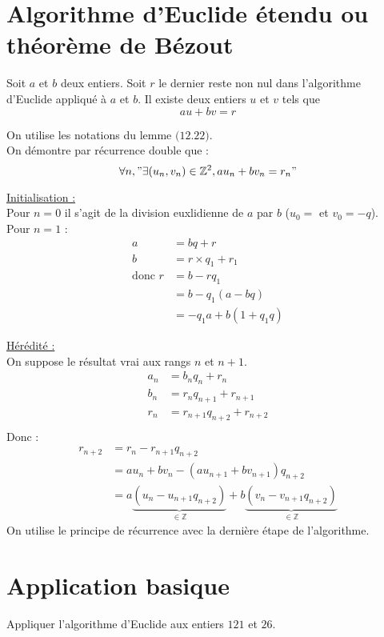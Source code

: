 \documentclass[../main.tex]{subfiles}
\begin{document}
\setcounter{section}{22}
\section{Algorithme d'Euclide étendu ou théorème de Bézout}
\begin{tcolorbox}[title=Lemme 12.23, title filled=false, colframe=orange, colback=orange!10!white]
    Soit $a$ et $b$ deux entiers. Soit $r$ le dernier reste non nul dans l'algorithme d'Euclide appliqué à $a$ et $b$. Il existe deux entiers $u$ et $v$ tels que
    $$au + bv = r$$
\end{tcolorbox}

On utilise les notations du lemme $\text{(12.22)}$. \\
On démontre par récurrence double que : 
$$\forall n, "\exists (u_n, v_n) \in \mathbb{Z}^2, au_n + bv_n = r_n"$$

\underline{Initialisation :} \\
Pour $n = 0$ il s'agit de la division euxlidienne de $a$ par $b$ ($u_0 = $ et $v_0 = -q$). \\
Pour $n = 1$ : 
\begin{align*}
    a &= bq + r \\
    b &= r \times q_1 + r_1 \\
    \text{donc } r &= b - rq_1 \\
    &= b - q_1(a - bq) \\
    &= -q_1a + b(1 + q_1q)
\end{align*}

\underline{Hérédité :} \\
On suppose le résultat vrai aux rangs $n$ et $n + 1$. \\
\begin{align*}
    a_n &= b_nq_n + r_n \\
    b_n &= r_nq_{n+1} + r_{n+1} \\
    r_n &= r_{n+1}q_{n+2} + r_{n+2} \\
\end{align*}
Donc : 
\begin{align*}
    r_{n+2} &= r_n - r_{n+1}q_{n+2} \\
    &=au_n + bv_n - (au_{n+1} + bv_{n+1})q_{n+2} \\
    &= a \underbrace{(u_n - u_{n+1}q_{n+2})}_{\in \mathbb{Z}} + b \underbrace{(v_n - v_{n+1}q_{n+2})}_{\in \mathbb{Z}}
\end{align*}
On utilise le principe de récurrence avec la dernière étape de l'algorithme. 

\section{Application basique}
\begin{tcolorbox}[title=Exemple 12.24, title filled=false, colframe=darkgreen, colback=darkgreen!10!white]
    Appliquer l'algorithme d'Euclide aux entiers $121$ et $26$. 
\end{tcolorbox}
\end{document}
